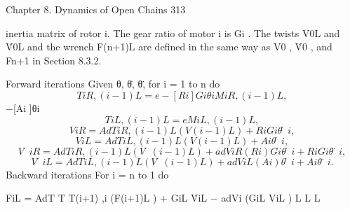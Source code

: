 \documentclass[12pt,a4paper]{article}
\begin{document}
Chapter 8. Dynamics of Open Chains                                                                  313

inertia matrix of rotor i. The gear ratio of motor i is Gi . The twists V0L and
V̇0L and the wrench F(n+1)L are defined in the same way as V0 , V̇0 , and Fn+1
in Section 8.3.2.

Forward iterations Given θ, θ̇, θ̈, for i = 1 to n do
\begin{equation}
TiR ,(i−1)L     = e−[Ri ]Gi θi MiR ,(i−1)L ,
\label{eq:8.103}
\end{equation}
                                    −[Ai ]θi
\begin{equation}
TiL ,(i−1)L   = e                  MiL ,(i−1)L ,
\label{eq:8.104}
\end{equation}
\begin{equation}
ViR    =        AdTiR ,(i−1)L (V(i−1)L ) + Ri Gi θ̇i ,
\label{eq:8.105}
\end{equation}
\begin{equation}
ViL    =        AdTiL ,(i−1)L (V(i−1)L ) + Ai θ̇i ,
\label{eq:8.106}
\end{equation}
\begin{equation}
V̇iR   =        AdTiR ,(i−1)L (V̇(i−1)L ) + adViR (Ri )Gi θ̇i + Ri Gi θ̈i ,
\label{eq:8.107}
\end{equation}
\begin{equation}
V̇iL   =        AdTiL ,(i−1)L (V̇(i−1)L ) + adViL (Ai )θ̇i + Ai θ̈i .
\label{eq:8.108}
\end{equation}
Backward iterations For i = n to 1 do

    FiL       =    AdT                                   T
                     T(i+1) ,i (F(i+1)L ) + GiL V̇iL − adVi (GiL ViL )
                               L   L                                 L
\end{document}
